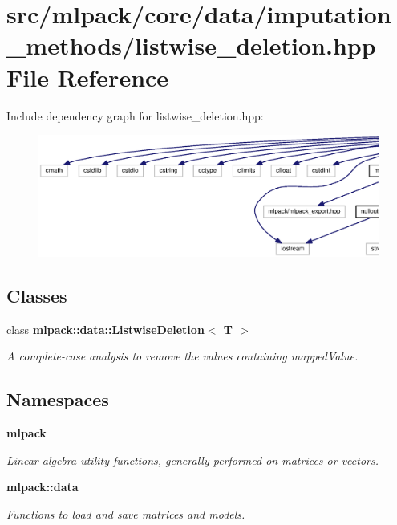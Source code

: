 \section{src/mlpack/core/data/imputation\+\_\+methods/listwise\+\_\+deletion.hpp File Reference}
\label{listwise__deletion_8hpp}
Include dependency graph for listwise\+\_\+deletion.\+hpp\+:
\nopagebreak
\begin{figure}[H]
\begin{center}
\leavevmode
\includegraphics[width=350pt]{listwise__deletion_8hpp__incl}
\end{center}
\end{figure}
\subsection*{Classes}
\begin{DoxyCompactItemize}
\item 
class {\bf mlpack\+::data\+::\+Listwise\+Deletion$<$ T $>$}
\begin{DoxyCompactList}\small\item\em A complete-\/case analysis to remove the values containing mapped\+Value. \end{DoxyCompactList}\end{DoxyCompactItemize}
\subsection*{Namespaces}
\begin{DoxyCompactItemize}
\item 
 {\bf mlpack}
\begin{DoxyCompactList}\small\item\em Linear algebra utility functions, generally performed on matrices or vectors. \end{DoxyCompactList}\item 
 {\bf mlpack\+::data}
\begin{DoxyCompactList}\small\item\em Functions to load and save matrices and models. \end{DoxyCompactList}\end{DoxyCompactItemize}


